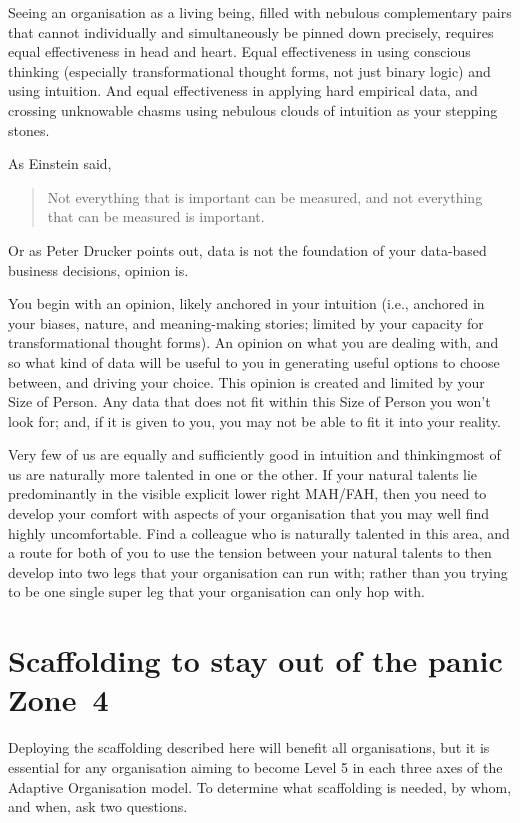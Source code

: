 Seeing an organisation as a living being, filled with nebulous complementary pairs that cannot individually and simultaneously be pinned down precisely, requires equal effectiveness in head and heart. Equal effectiveness in using conscious thinking (especially transformational thought forms, not just binary logic) and using intuition. And equal effectiveness in applying hard empirical data, and crossing unknowable chasms using nebulous clouds of intuition as your stepping stones.


As Einstein said, 
\begin{quote} 
Not everything that is important can be measured, and not everything that can be measured is important. 
\end{quote} 


Or as Peter Drucker  points out, data is not the foundation of your data-based business decisions, opinion is. 


You begin with an opinion, likely anchored in your intuition (i.e., anchored in your biases, nature, and meaning\hyp{}making stories; limited by your capacity for transformational thought forms). An opinion on what you are dealing with, and so what kind of data will be useful to you in generating useful options to choose between, and driving your choice. This opinion is created and limited by your Size of Person. Any data that does not fit within this Size of Person  you won’t look for; and, if it is given to you, you may not be able to fit it into your reality.


Very few of us are equally and sufficiently good in intuition and thinking\textemdash most of us are naturally more talented in one or the other. If your natural talents lie predominantly in the visible explicit lower right MAH/FAH, then you need to develop your comfort with aspects of your organisation that you may well find highly uncomfortable. Find a colleague who is naturally talented in this area, and a route for both of you to use the tension between your natural talents to then develop into two legs that your organisation can run with; rather than you trying to be one single super leg that your organisation can only hop with.






\section{Scaffolding to stay out of the panic Zone~4}
Deploying the scaffolding described here will benefit all organisations, but it is essential for any organisation aiming to become Level 5 in each three axes of the Adaptive Organisation model. To determine what scaffolding is needed, by whom, and when, ask two questions.


